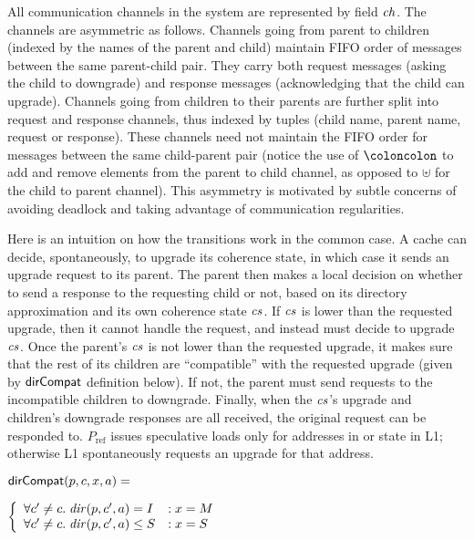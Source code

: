 All communication channels in the system are represented by field $\mathit{ch}$.  The
channels are asymmetric as follows. Channels going from parent to children
(indexed by the names of the parent and child) maintain FIFO order of messages
between the same parent-child pair. They carry both request messages (asking
the child to downgrade) and response messages (acknowledging that the child can
upgrade). Channels going from children to their parents are further split into
request and response channels, thus indexed by tuples (child name, parent name,
request or response).  These channels need not maintain the FIFO order for
messages between the same child-parent pair (notice the use of $\coloncolon$ to
add and remove elements from the parent to child channel, as opposed to
$\uplus$ for the child to parent channel). This asymmetry is motivated by subtle
concerns of avoiding deadlock and taking advantage of communication regularities.

Here is an intuition on how the transitions work in the common case.  A cache
can decide, spontaneously, to upgrade its coherence state, in which case it
sends an upgrade request to its parent. The parent then makes a local decision
on whether to send a response to the requesting child or not, based on its
directory approximation and its own coherence state $\mathit{cs}$. If $\mathit{cs}$ is lower than
the requested upgrade, then it cannot handle the request, and instead must
decide to upgrade $\mathit{cs}$.  Once the parent's $\mathit{cs}$ is not lower than the requested
upgrade, it makes sure that the rest of its children are ``compatible'' with
the requested upgrade (given by $\mathsf{dirCompat}$ definition below).  If not, the
parent must send requests to the incompatible children to downgrade. Finally, when
the $\mathit{cs}$'s upgrade and children's downgrade responses are all received, the
original request can be responded to. $P_\text{ref}$ issues speculative
loads only for addresses in \Sh{} or \Mo{} state in L1; otherwise L1
spontaneously requests an upgrade for that address.

\begin{defn}
$\mathsf{dirCompat}(p, c, x, a) =$

\begin{math}
\left\{
\begin{array}{ll}
\forall c' \neq c. \; \mathit{dir}(p,c',a) = I &: x = M\\
\forall c' \neq c. \; \mathit{dir}(p,c',a) \le S &: x = S\\
\end{array}
\right.
\end{math}
\end{defn}

